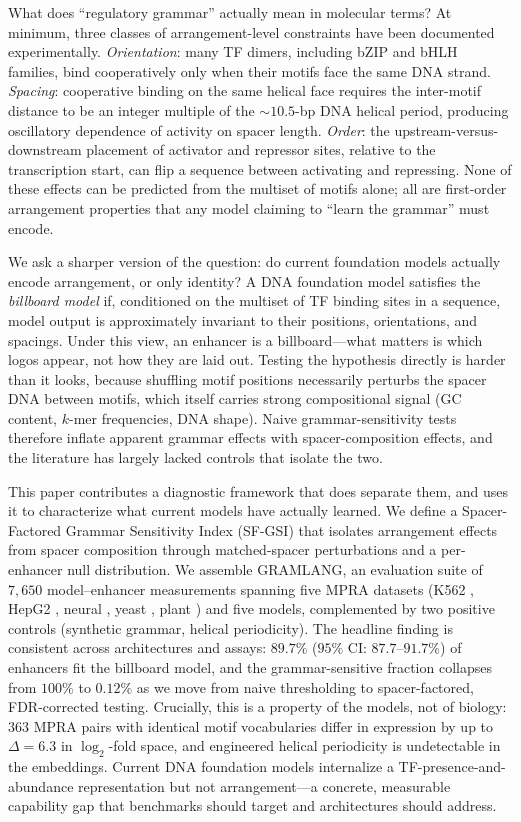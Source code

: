 \documentclass{article}
\begin{document}
What does ``regulatory grammar'' actually mean in molecular terms? At minimum, three classes of arrangement-level constraints have been documented experimentally. \emph{Orientation}: many TF dimers, including bZIP and bHLH families, bind cooperatively only when their motifs face the same DNA strand. \emph{Spacing}: cooperative binding on the same helical face requires the inter-motif distance to be an integer multiple of the $\sim 10.5$-bp DNA helical period, producing oscillatory dependence of activity on spacer length. \emph{Order}: the upstream-versus-downstream placement of activator and repressor sites, relative to the transcription start, can flip a sequence between activating and repressing. None of these effects can be predicted from the multiset of motifs alone; all are first-order arrangement properties that any model claiming to ``learn the grammar'' must encode.

We ask a sharper version of the question: do current foundation models actually encode arrangement, or only identity? A DNA foundation model satisfies the \emph{billboard model} if, conditioned on the multiset of TF binding sites in a sequence, model output is approximately invariant to their positions, orientations, and spacings. Under this view, an enhancer is a billboard---what matters is which logos appear, not how they are laid out. Testing the hypothesis directly is harder than it looks, because shuffling motif positions necessarily perturbs the spacer DNA between motifs, which itself carries strong compositional signal (GC content, $k$-mer frequencies, DNA shape). Naive grammar-sensitivity tests therefore inflate apparent grammar effects with spacer-composition effects, and the literature has largely lacked controls that isolate the two.

This paper contributes a diagnostic framework that does separate them, and uses it to characterize what current models have actually learned. We define a Spacer-Factored Grammar Sensitivity Index (SF-GSI) that isolates arrangement effects from spacer composition through matched-spacer perturbations and a per-enhancer null distribution. We assemble GRAMLANG, an evaluation suite of $7{,}650$ model--enhancer measurements spanning five MPRA datasets (K562 \citep{agarwal2025}, HepG2 \citep{klein2020}, neural \citep{inoue2019}, yeast \citep{vaishnav2022}, plant \citep{jores2021}) and five models, complemented by two positive controls (synthetic grammar, helical periodicity). The headline finding is consistent across architectures and assays: $89.7\%$ ($95\%$ CI: $87.7$--$91.7\%$) of enhancers fit the billboard model, and the grammar-sensitive fraction collapses from $100\%$ to $0.12\%$ as we move from naive thresholding to spacer-factored, FDR-corrected testing. Crucially, this is a property of the models, not of biology: $363$ MPRA pairs with identical motif vocabularies differ in expression by up to $\Delta = 6.3$ in $\log_2$-fold space, and engineered helical periodicity is undetectable in the embeddings. Current DNA foundation models internalize a TF-presence-and-abundance representation but not arrangement---a concrete, measurable capability gap that benchmarks should target and architectures should address.
\end{document}

